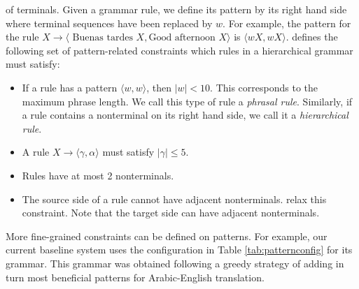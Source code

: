   of terminals. Given a grammar rule, we define its pattern by its right hand side where terminal sequences have been replaced by $w$.
  For example, the pattern for the rule $ X \rightarrow \langle \mbox{ Buenas tardes } X, \mbox{Good afternoon } X \rangle$ is $\langle w X, w X \rangle$.
  \citet{chiang:2007:CL} defines the following set of pattern-related constraints which rules in a hierarchical grammar must satisfy:
%
  \begin{itemize}
    \item If a rule has a pattern $\langle w, w \rangle$, then $|w| < 10$. This corresponds to the maximum phrase length. We call this type of rule a {\em phrasal rule}. Similarly, if a rule contains
      a nonterminal on its right hand side, we call it a {\em hierarchical rule}.
    \item A rule $X \rightarrow \langle \gamma, \alpha \rangle$ must satisfy $|\gamma| \leq 5$.
    \item Rules have at most 2 nonterminals.
    \item The source side of a rule cannot have adjacent nonterminals. \citet{setiawan-resnik:2010:NAACL} relax this constraint. Note that the target side can have adjacent nonterminals. %
  \end{itemize}
%
  More fine-grained constraints can be defined on patterns. For example, our current baseline system uses the configuration in Table \ref{tab:patternconfig}
  for its grammar. This grammar was obtained following a greedy strategy of adding in turn most beneficial patterns for Arabic-English translation.

